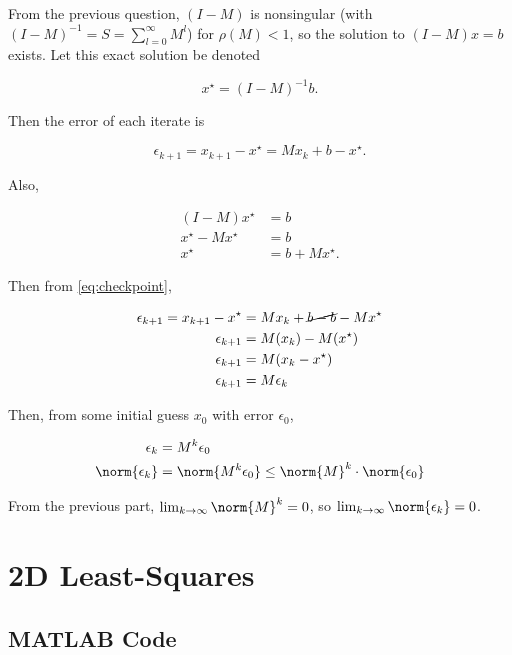 \documentclass{template}
\begin{document}
From the previous question, $(I-M)$ is nonsingular (with $(I-M)^{-1} = S = \sum_{l=0}^{\infty}M^l$) for $\rho(M) < 1$, so the solution to $(I - M)x = b$ exists. Let this exact solution be denoted

\begin{equation}
  x^\star = (I-M)^{-1}b.
\end{equation}

Then the error of each iterate is

\begin{equation}\label{eq:checkpoint}
  \epsilon_{k+1} = x_{k+1} - x^\star = Mx_k + b - x^\star.
\end{equation}

Also,

\begin{align}
  (I-M)x^\star &= b\\
  x^\star - Mx^\star &= b\\
  x^\star &= b + Mx^\star.
\end{align}

Then from \autoref{eq:checkpoint},

\begin{align}
  \epsilon_{k+1} = x_{k+1} - x^\star &= Mx_k + \cancel{b - b} - Mx^\star\\
  \epsilon_{k+1} &= M(x_k) - M(x^\star)\\
  \epsilon_{k+1} &= M(x_k - x^\star)\\
  \epsilon_{k+1} &= M\epsilon_k
\end{align}

Then, from some initial guess $x_0$ with error $\epsilon_0$, 

\begin{align}
  \epsilon_k &= M^k\epsilon_0\\
  \norm{\epsilon_k} &= \norm{M^k\epsilon_0} \leq \norm{M}^k\cdot\norm{\epsilon_0}
\end{align}

From the previous part, $\lim_{k\rightarrow\infty}\norm{M}^k = 0$, so $\lim_{k\rightarrow\infty}\norm{\epsilon_k} = 0$.

\section{2D Least-Squares}

\subsection{MATLAB Code}
\end{document}
